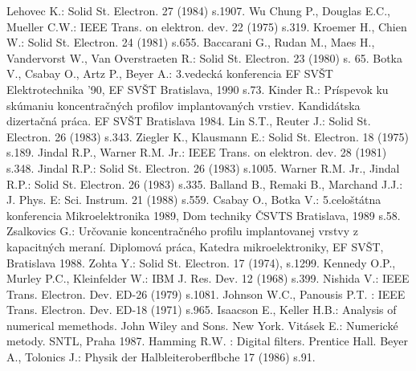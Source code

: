 \begin{thebibliography}{}
 Lehovec K.: Solid St.  Electron.  27 (1984) s.1907.
 Wu Chung P., Douglas E.C., Mueller C.W.: IEEE
  Trans. on elektron. dev. 22 (1975) s.319.
 Kroemer H., Chien W.: Solid St. Electron. 24 (1981)
  s.655.
 Baccarani G., Rudan M., Maes H., Vandervorst W.,
  Van Overstraeten R.: Solid St. Electron. 23 (1980) s. 65.
 Botka V., Csabay O., Artz P., Beyer A.: 3.vedecká
  konferencia EF SVŠT Elektrotechnika '90, EF SVŠT Bratislava, 1990
  s.73.
 Kinder R.: Príspevok ku skúmaniu koncentračných
  profilov implantovaných vrstiev. Kandidátska dizertačná práca. EF
  SVŠT Bratislava 1984.
 Lin S.T., Reuter J.: Solid St. Electron. 26 (1983)
  s.343.
 Ziegler K., Klausmann E.: Solid St. Electron. 18
  (1975) s.189.
 Jindal R.P., Warner R.M. Jr.: IEEE Trans. on
  elektron. dev. 28 (1981) s.348.
 Jindal R.P.: Solid St. Electron. 26 (1983)
  s.1005.
 Warner R.M. Jr., Jindal R.P.: Solid
  St. Electron. 26 (1983) s.335.
 Balland B., Remaki B., Marchand J.J.: J. Phys. E:
  Sci. Instrum. 21 (1988) s.559.
 Csabay O., Botka V.: 5.celoštátna konferencia
  Mikroelektronika 1989, Dom techniky ČSVTS Bratislava, 1989 s.58.
 Zsalkovics G.: Určovanie koncentračného profilu
  implantovanej vrstvy z kapacitných meraní. Diplomová práca, Katedra
  mikroelektroniky, EF SVŠT, Bratislava 1988.
 Zohta Y.: Solid St. Electron. 17 (1974), s.1299.
 Kennedy O.P., Murley P.C., Kleinfelder W.: IBM
  J. Res. Dev. 12 (1968) s.399.
 Nishida V.: IEEE Trans. Electron. Dev. ED-26
  (1979) s.1081.
 Johnson W.C., Panousis P.T. : IEEE
  Trans. Electron. Dev. ED-18 (1971) s.965.
 Isaacson E., Keller H.B.: Analysis of numerical
  memethods.  John Wiley and Sons. New York.
 Vitásek E.: Numerické metody. SNTL, Praha 1987.
 Hamming R.W. : Digital filters. Prentice Hall.
 Beyer A., Tolonics J.: Physik der
  Halbleiteroberflbche 17 (1986) s.91.
\end{thebibliography}
